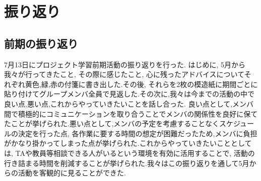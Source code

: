 \chapter{振り返り}

\section{前期の振り返り}
7月13日にプロジェクト学習前期活動の振り返りを行った. はじめに, 5月から我々が行ってきたこと, その際に感じたこと, 心に残ったアドバイスについてそれぞれ黄色,緑,赤の付箋に書き出した.その後,
それらを2枚の模造紙に期間ごとに貼り付けてグループメンバ全員で見返した.その次に,我々は今までの活動の中で良い点,悪い点,これからやっていきたいことを話し合った.
良い点として,メンバ間で積極的にコミュニケーションを取り合うことでメンバの関係性を良好に保てたことが挙げられた.悪い点として,メンバの予定を考慮することなくスケジュールの決定を行った点,
各作業に要する時間の想定が困難だったため,メンバに負担がかなり掛かってしまった点が挙げられた.これからやっていきたいこととしては, TAや教員等相談できる人がいるという環境を有効に活用することで,
活動の行き詰まる時間を削減することが挙げられた.我々はこの振り返りを通して5月からの活動を客観的に見ることができた.

